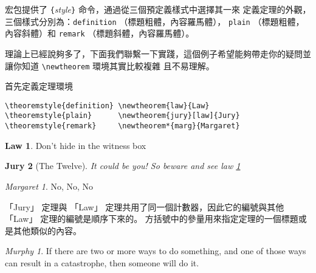 %

 宏包提供了 \verb|{|\emph{style}\verb|}| 命令，通過從三個預定義樣式中選擇其一來
定義定理的外觀，三個樣式分別為：\texttt{definition} （標題粗體，內容羅馬體），
\texttt{plain} （標題粗體，內容斜體）和 \texttt{remark} 
（標題斜體，內容羅馬體）。

理論上已經說夠多了，下面我們聯繫一下實踐，這個例子希望能夠帶走你的疑問並讓你知道 \verb|\newtheorem| 環境其實比較複雜
且不易理解。
\theoremstyle{definition} \newtheorem{law}{Law}
\theoremstyle{plain}      \newtheorem{jury}[law]{Jury}
\theoremstyle{remark}     \newtheorem*{marg}{Margaret}

首先定義定理環境
\begin{verbatim}
\theoremstyle{definition} \newtheorem{law}{Law}
\theoremstyle{plain}      \newtheorem{jury}[law]{Jury}
\theoremstyle{remark}     \newtheorem*{marg}{Margaret}
\end{verbatim}

\begin{example}
\begin{law} \label{law:box}
Don't hide in the witness box
\end{law}
\begin{jury}[The Twelve]
It could be you! So beware and
see law \ref{law:box}\end{jury}
\begin{marg}No, No, No\end{marg}
\end{example}

「Jury」 定理與 「Law」 定理共用了同一個計數器，因此它的編號與其他 「Law」 定理的編號是順序下來的。
方括號中的參量用來指定定理的一個標題或是其他類似的內容。
\begin{example}
\flushleft
\newtheorem{mur}{Murphy}[section]
\begin{mur}
If there are two or more
ways to do something, and
one of those ways can result
in a catastrophe, then
someone will do it.\end{mur}
\end{example}

